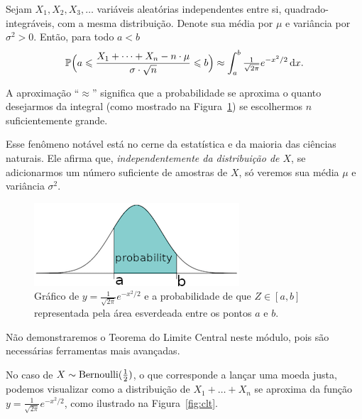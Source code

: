 \begin{theorem}
Sejam $ X_1,X_2,X_3,\dots $ variáveis aleatórias independentes entre si, quadrado-integráveis, com a mesma distribuição. Denote sua média por $ \mu $ e variância por $ \sigma^2 > 0 $.
Então, para todo $ a<b $
\[
\mathbb{P}\Big( a \leqslant \frac{X_1+\dots+X_n - n\cdot \mu}{\sigma \cdot \sqrt{n}} \leqslant b \Big)
\approx
\int_a^b
\tfrac{1}{\sqrt{2 \pi}}
e^{-x^2/2} \, \mathrm{d} x
.
\]
\end{theorem}
A aproximação ``$ {\approx} $'' significa que a probabilidade se aproxima o quanto desejarmos da integral (como mostrado na Figura~\ref{fig:normalarea}) se escolhermos $ n $ suficientemente grande.

Esse fenômeno notável está no cerne da estatística e da maioria das ciências naturais.
Ele afirma que, \emph{independentemente da distribuição de $ X $}, se adicionarmos um número suficiente de amostras de $ X $, só veremos sua média $ \mu $ e variância $ \sigma^2 $.

\begin{figure}[b!]
\centering
\includegraphics[width=.5\textwidth]{Pictures/normalarea}
\caption{Gráfico de $ y = \frac{1}{\sqrt{2\pi}}e^{-x^2/2} $ e a probabilidade de que $ Z \in [a,b] $ representada pela área esverdeada entre os pontos $ a $ e $ b $.}
\label{fig:normalarea}
\end{figure}

Não demonstraremos o Teorema do Limite Central neste módulo, pois são necessárias ferramentas mais avançadas.

No caso de $ X \sim \mathrm{Bernoulli}(\frac{1}{2}) $, o que corresponde a lançar uma moeda justa, podemos visualizar como a distribuição de $ X_1+\dots+X_n $ se aproxima da função
$ y = \frac{1}{\sqrt{2 \pi}} e^{-x^2/2} $, como ilustrado na Figura~\ref{fig:clt}.

